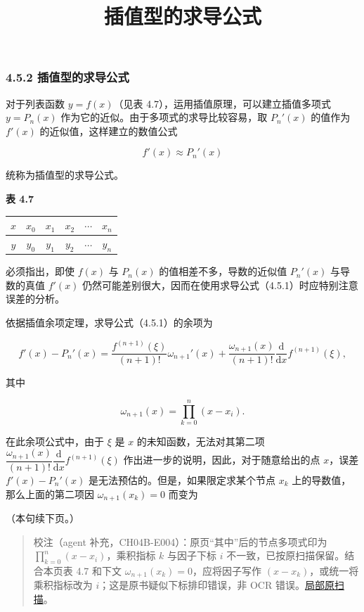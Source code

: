 \documentclass[
  10pt,
  fontset=fandol]{ctexart}
\title{插值型的求导公式}
\author{}
\date{}
\newcounter{none} %
\begin{document}
\maketitle

\subsubsection{4.5.2 插值型的求导公式}\label{ux63d2ux503cux578bux7684ux6c42ux5bfcux516cux5f0f}

对于列表函数 \(y=f(x)\)（见表 4.7），运用插值原理，可以建立插值多项式 \(y=P_n(x)\) 作为它的近似。由于多项式的求导比较容易，取 \(P_n'(x)\) 的值作为 \(f'(x)\) 的近似值，这样建立的数值公式

\[
f'(x)\approx P_n'(x)
\tag{4.5.1}
\]

统称为插值型的求导公式。

\textbf{表 4.7}

{\def\LTcaptype{none} %
\begin{longtable}[]{@{}cccccc@{}}
\toprule\noalign{}
\(x\) & \(x_0\) & \(x_1\) & \(x_2\) & \(\cdots\) & \(x_n\) \\
\midrule\noalign{}
\endhead
\bottomrule\noalign{}
\endlastfoot
\(y\) & \(y_0\) & \(y_1\) & \(y_2\) & \(\cdots\) & \(y_n\) \\
\end{longtable}
}

必须指出，即使 \(f(x)\) 与 \(P_n(x)\) 的值相差不多，导数的近似值 \(P_n'(x)\) 与导数的真值 \(f'(x)\) 仍然可能差别很大，因而在使用求导公式（4.5.1）时应特别注意误差的分析。

依据插值余项定理，求导公式（4.5.1）的余项为

\[
f'(x)-P_n'(x)=\frac{f^{(n+1)}(\xi)}{(n+1)!}\omega_{n+1}'(x)
+\frac{\omega_{n+1}(x)}{(n+1)!}\frac{\mathrm{d}}{\mathrm{d}x}f^{(n+1)}(\xi),
\]

其中

\[
\omega_{n+1}(x)=\prod_{k=0}^{n}(x-x_i).
\]

在此余项公式中，由于 \(\xi\) 是 \(x\) 的未知函数，无法对其第二项 \(\dfrac{\omega_{n+1}(x)}{(n+1)!}\dfrac{\mathrm{d}}{\mathrm{d}x}f^{(n+1)}(\xi)\) 作出进一步的说明，因此，对于随意给出的点 \(x\)，误差 \(f'(x)-P_n'(x)\) 是无法预估的。但是，如果限定求某个节点 \(x_k\) 上的导数值，那么上面的第二项因 \(\omega_{n+1}(x_k)=0\) 而变为

（本句续下页。）

\begin{quote}
校注（agent 补充，CH04B-E004）：原页``其中''后的节点多项式印为 \(\prod_{k=0}^{n}(x-x_i)\)，乘积指标 \(k\) 与因子下标 \(i\) 不一致，已按原扫描保留。结合本页表 4.7 和下文 \(\omega_{n+1}(x_k)=0\)，应将因子写作 \((x-x_k)\)，或统一将乘积指标改为 \(i\)；这是原书疑似下标排印错误，非 OCR 错误。\href{../assets/ch04b/review-p113-product.png}{局部原扫描}。
\end{quote}
\end{document}
